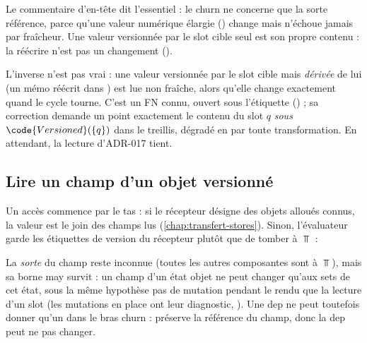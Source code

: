 
Le commentaire d'en-tête dit l'essentiel : le churn ne concerne que la
sorte référence, parce qu'une valeur numérique élargie ()
change mais n'échoue jamais  \og par fraîcheur\fg{}. Une
valeur versionnée par le slot cible seul est son propre contenu : la
réécrire n'est pas un changement ().

\begin{piege}
  L'inverse n'est pas vrai : une valeur versionnée par le slot cible mais
  \emph{dérivée} de lui (un mémo  réécrit dans ) est lue \og non fraîche\fg{}, alors qu'elle
  change exactement quand le cycle tourne. C'est un FN connu, ouvert sous
  l'étiquette  () ; sa correction demande un
  point \og exactement le contenu du slot $q$\fg{} \emph{sous}
  $\code{Versioned}(\{q\})$ dans le treillis, dégradé en 
  par toute transformation. En attendant, la lecture d'ADR-017 tient.
\end{piege}

\subsection{Lire un champ d'un objet versionné}

Un accès  commence par le tas : si le récepteur désigne des
objets alloués connus, la valeur est le join des champs lus
(\cref{chap:transfert-stores}). Sinon, l'évaluateur garde les étiquettes de
version du récepteur plutôt que de tomber à $\Top$ :


La \emph{sorte} du champ reste inconnue (toutes les autres composantes sont à
$\Top$), mais sa borne may survit : un champ d'un état objet ne peut changer
qu'aux sets de cet état, sous la même hypothèse \og pas de mutation pendant
le rendu\fg{} que la lecture d'un slot (les mutations en place ont leur
diagnostic, ). Une dep  ne peut
toutefois donner qu'un \Warning{} dans le bras churn :
 préserve la référence du champ, donc la
dep peut ne pas changer.

